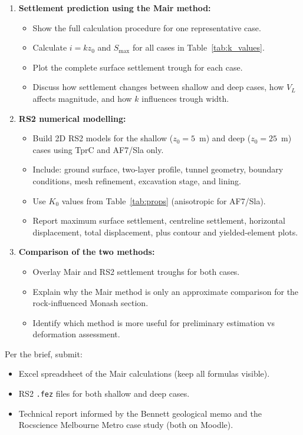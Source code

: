 \documentclass[a4paper,12pt]{article}
\begin{document}
\begin{enumerate}
    \item \textbf{Settlement prediction using the Mair method:}
    \begin{itemize}
        \item Show the full calculation procedure for one representative case.
        \item Calculate $i = k z_0$ and $S_{\text{max}}$ for all cases in Table~\ref{tab:k_values}.
        \item Plot the complete surface settlement trough for each case.
        \item Discuss how settlement changes between shallow and deep cases, how $V_L$ affects magnitude, and how $k$ influences trough width.
    \end{itemize}

    \item \textbf{RS2 numerical modelling:}
    \begin{itemize}
        \item Build 2D RS2 models for the shallow ($z_0=5$~m) and deep ($z_0=25$~m) cases using TprC and AF7/Sla only.
        \item Include: ground surface, two-layer profile, tunnel geometry, boundary conditions, mesh refinement, excavation stage, and lining.
        \item Use $K_0$ values from Table~\ref{tab:props} (anisotropic for AF7/Sla).
        \item Report maximum surface settlement, centreline settlement, horizontal displacement, total displacement, plus contour and yielded-element plots.
    \end{itemize}

    \item \textbf{Comparison of the two methods:}
    \begin{itemize}
        \item Overlay Mair and RS2 settlement troughs for both cases.
        \item Explain why the Mair method is only an approximate comparison for the rock-influenced Monash section.
        \item Identify which method is more useful for preliminary estimation vs deformation assessment.
    \end{itemize}
\end{enumerate}

\begin{notebox}
Per the brief, submit:
\begin{itemize}[nosep]
    \item Excel spreadsheet of the Mair calculations (keep all formulas visible).
    \item RS2 \texttt{.fez} files for both shallow and deep cases.
    \item Technical report informed by the Bennett geological memo and the Rocscience Melbourne Metro case study (both on Moodle).
\end{itemize}
\end{notebox}
\end{document}
